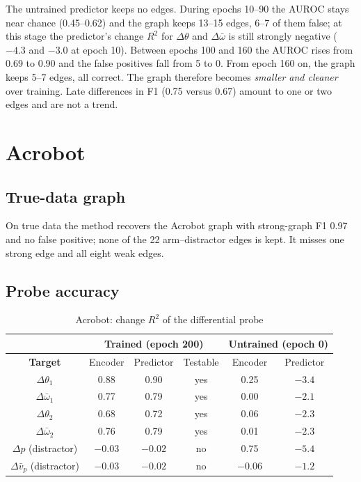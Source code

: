 \documentclass[11pt, a4paper, oneside,enumerate,textcomp]{report}
\newcommand{\vb}{\bar{v}}
\newcommand{\wb}{\bar{\omega}}
\newcommand{\dd}{\Delta}
\newcommand{\Rsq}{R^2}
\begin{document}
The untrained predictor keeps no edges. During epochs 10--90 the AUROC stays near chance (0.45--0.62) and the graph keeps 13--15 edges, 6--7 of them false; at this stage the predictor's change $\Rsq$ for $\dd\theta$ and $\dd\wb$ is still strongly negative ($-4.3$ and $-3.0$ at epoch 10). Between epochs 100 and 160 the AUROC rises from 0.69 to 0.90 and the false positives fall from 5 to 0. From epoch 160 on, the graph keeps 5--7 edges, all correct. The graph therefore becomes \emph{smaller and cleaner} over training. Late differences in F1 (0.75 versus 0.67) amount to one or two edges and are not a trend.

\section{Acrobot}

\subsection{True-data graph}

On true data the method recovers the Acrobot graph with strong-graph F1 0.97 and no false positive; none of the 22 arm--distractor edges is kept. It misses one strong edge and all eight weak edges.

\subsection{Probe accuracy}

\begin{table}[htbp]
\caption{Acrobot: change $\Rsq$ of the differential probe}
\centering
\small
\begin{tabular}{| c | c | c | c | c | c |}
\hline
 & \multicolumn{3}{c|}{\textbf{Trained (epoch 200)}} & \multicolumn{2}{c|}{\textbf{Untrained (epoch 0)}} \\
\hline
\textbf{Target} & Encoder & Predictor & Testable & Encoder & Predictor \\
\hline
$\dd\theta_1$ & 0.88 & 0.90 & yes & 0.25 & $-3.4$ \\
$\dd\wb_1$ & 0.77 & 0.79 & yes & 0.00 & $-2.1$ \\
$\dd\theta_2$ & 0.68 & 0.72 & yes & 0.06 & $-2.3$ \\
$\dd\wb_2$ & 0.76 & 0.79 & yes & 0.01 & $-2.3$ \\
$\dd p$ (distractor) & $-0.03$ & $-0.02$ & no & 0.75 & $-5.4$ \\
$\dd\vb_p$ (distractor) & $-0.03$ & $-0.02$ & no & $-0.06$ & $-1.2$ \\
\hline
\end{tabular}
\label{tab:ac_r2}
\end{table}
\end{document}
